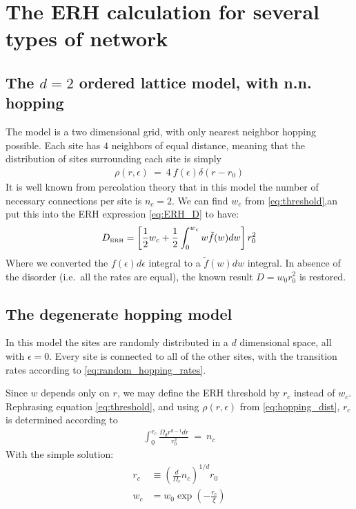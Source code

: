 \section{The ERH calculation for several types of network}
\subsection{The $d=2$ ordered lattice model, with n.n. hopping}

The model is a  two dimensional grid, with only nearest neighbor hopping possible. 
Each site has $4$ neighbors of equal distance, meaning that
the distribution of sites surrounding each site is simply
%
\begin{align}
\rho(r,\epsilon) \ = \ 4\ f(\epsilon)\delta(r-r_0) 
\end{align}
%
It is well known from percolation theory \cite{someonethatsaysthis} that in this model the number of necessary connections per site is $n_c=2$. We can
find $w_c$ from \ref{eq:threshold},an put this into the ERH 
expression \ref{eq:ERH_D} to have:
%
\begin{align}
D_{\mbox{\tiny ERH}} =  \left[\frac{1}{2}w_c + \frac{1}{2}\int_0^{w_c} w\tilde{f}(w) dw\right]r_0^2
\end{align}
%
Where we converted the $f(\epsilon)d\epsilon$ integral to a $\tilde{f}(w)dw$
integral. In absence of the disorder (i.e.\ all the rates are equal),
the known result $D = w_0r_0^2$ is restored.


\subsection{The degenerate hopping model}

In this model the sites are randomly distributed in a $d$ dimensional 
space, all with $\epsilon=0$. Every site is connected to all of the other
sites, with the transition rates according to \ref{eq:random_hopping_rates}.

Since $w$ depends only on $r$, we may define the ERH threshold by
$r_c$ instead of $w_c$. Rephrasing equation \ref{eq:threshold}, and 
using $\rho(r,\epsilon)$ from \ref{eq:hopping_dist}, $r_c$ is determined according to
%
\begin{align}
\int_0^{r_c} \frac{\Omega_d r^{d-1} dr}{r_0^2} \ = \  n_c 
\end{align}
%
With the simple solution:
%
\begin{align}
r_c  &\equiv \left(\frac{d}{\Omega_c}n_c\right)^{1/d}  r_0 \\
w_c &= w_0\exp\left(-\frac{r_c}{\xi}\right) 
\end{align}
%


